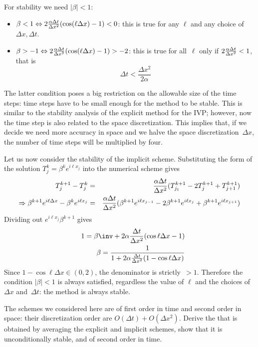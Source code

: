 For stability we need $|\beta|<1$:
  \begin{itemize}
  \item $\beta<1\Leftrightarrow 2\frac{\alpha\Delta t}{\Delta x^2}(\cos(\ell\Delta x)-1)<0$: this is
    true for any $\ell$ and any choice of $\Delta x,\Delta t$.
  \item $\beta>-1\Leftrightarrow 2\frac{\alpha\Delta t}{\Delta x^2}(\cos(\ell\Delta x)-1)>-2$: this
    is true for all~$\ell$ only if $2\frac{\alpha\Delta t}{\Delta x^2}<1$, that is
    \[ \Delta t<\frac{\Delta x^2}{2\alpha} \]
  \end{itemize}
The latter condition poses a big restriction on the allowable size of
the time steps: time steps have to be small enough for the method to
be stable. This is similar to the stability analysis of the explicit
method for the \ac{IVP}; however, now the time step is also related to
the space discretization. This implies that, if we decide we need more
accuracy in space and we halve the space discretization~$\Delta x$,
the number of time steps will be multiplied by four.

Let us now consider the stability of the implicit scheme.
Substituting the form of the solution $T_j^k=\beta^ke^{i\ell x_j}$
into the numerical scheme gives
  \begin{eqnarray*}
    T_j^{k+1}-T_j^k&=&\frac{\alpha\Delta t}{\Delta x^2}(T_{j_1}^{k+1}-2T_j^{k+1}+T_{j+1}^{k+1})\\
    \Rightarrow \beta^{k+1}e^{i\ell \Delta x}-\beta^ke^{i\ell x_j}&=&
    \frac{\alpha\Delta t}{\Delta x^2}(\beta^{k+1}e^{i\ell x_{j-1}}-2\beta^{k+1}e^{i\ell x_j}
    +\beta^{k+1}e^{i\ell x_{j+1}})
  \end{eqnarray*}
Dividing out $e^{i\ell x_j}\beta^{k+1}$ gives
  \begin{eqnarray*}
    &&1=\beta\inv+2\alpha\frac{\Delta t}{\Delta x^2}(\cos\ell\Delta
    x-1)\\
    &&\beta=\frac1{1+2\alpha\frac{\Delta t}{\Delta x^2}(1-\cos\ell\Delta x)}
  \end{eqnarray*}
Since $1-\cos\ell\Delta x\in(0,2)$, the denominator is strictly~$>1$.
Therefore the condition $|\beta|<1$ is always satisfied, regardless
the value of $\ell$ and the choices
of $\Delta x$ and~$\Delta t$: the method is always stable.

\begin{exercise}
  \label{ex:crank}
  The schemes we considered here are of first order in time and second
  order in space: their discretization order are $O(\Delta t)+O(\Delta
  x^2)$. Derive the  that is obtained
  by averaging the explicit and implicit schemes, show that it is
  unconditionally stable, and of second order in time.
\end{exercise}

